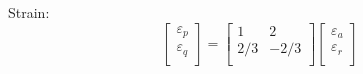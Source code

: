 \documentclass[notes]{beamer}
\begin{document}
\begin{frame}
Strain:
\begin{equation}
	\begin{bmatrix}
		\varepsilon_p \\
		\varepsilon_q \\
	\end{bmatrix}%
	=%
	\begin{bmatrix}
		1   &  2\\
		2/3   & -2/3\\
	\end{bmatrix}%
	\begin{bmatrix}
		\varepsilon_a \\
		\varepsilon_r \\
	\end{bmatrix}%
	\label{eq:strain-strain}
\end{equation}
\end{frame}
\end{document}
